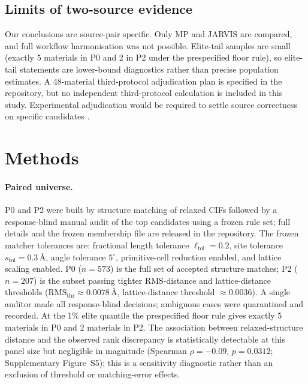 \documentclass[11pt]{article}
\begin{document}
\subsection{Limits of two-source evidence}

Our conclusions are source-pair specific.
Only MP and JARVIS are compared, and full workflow harmonisation was not possible.
Elite-tail samples are small (exactly 5 materials in P0 and 2 in P2 under the prespecified floor rule), so elite-tail statements are lower-bound diagnostics rather than precise population estimates.
A 48-material third-protocol adjudication plan is specified in the repository, but no independent third-protocol calculation is included in this study.
Experimental adjudication would be required to settle source correctness on specific candidates \cite{wilkinson2016,choudhary2024leaderboard}.

\section{Methods}
\label{sec:methods}

\paragraph{Paired universe.}
P0 and P2 were built by structure matching of relaxed CIFs followed by a response-blind manual audit of the top candidates using a frozen rule set; full details and the frozen membership file are released in the repository.
The frozen matcher tolerances are: fractional length tolerance $\ell_\mathrm{tol}=0.2$, site tolerance $s_\mathrm{tol}=0.3$\,\AA, angle tolerance $5^\circ$, primitive-cell reduction enabled, and lattice scaling enabled.
P0 ($n=573$) is the full set of accepted structure matches; P2 ($n=207$) is the subset passing tighter RMS-distance and lattice-distance thresholds ($\mathrm{RMS}_\mathrm{thr}\approx0.0078$\,\AA, lattice-distance threshold $\approx0.0036$).
A single auditor made all response-blind decisions; ambiguous cases were quarantined and recorded.
At the 1\% elite quantile the prespecified floor rule gives exactly 5 materials in P0 and 2 materials in P2.
The association between relaxed-structure distance and the observed rank discrepancy is statistically detectable at this panel size but negligible in magnitude (Spearman $\rho=-0.09$, $p=0.0312$; Supplementary Figure~S5); this is a sensitivity diagnostic rather than an exclusion of threshold or matching-error effects.
\end{document}
